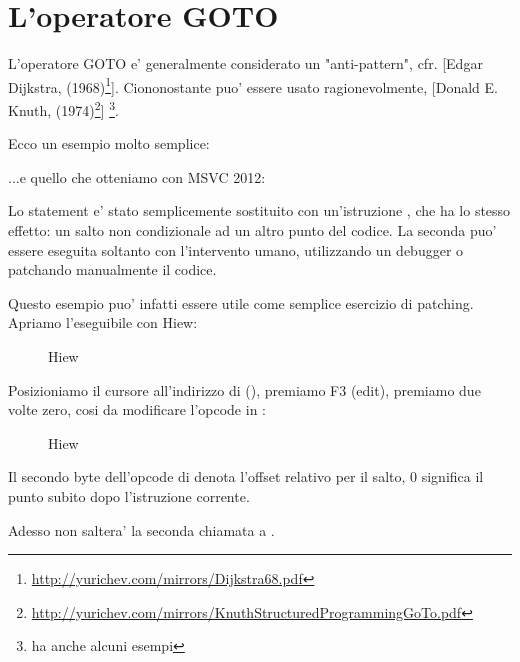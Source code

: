 \section{L'operatore GOTO}

L'operatore GOTO e' generalmente considerato un "anti-pattern", cfr. [Edgar Dijkstra,  (1968)\footnote{\url{http://yurichev.com/mirrors/Dijkstra68.pdf}}].
Ciononostante puo' essere usato ragionevolmente, [Donald E. Knuth,  (1974)\footnote{\url{http://yurichev.com/mirrors/KnuthStructuredProgrammingGoTo.pdf}}]
\footnote{\InSqBrackets{\CNotes} ha anche alcuni esempi}.

Ecco un esempio molto semplice:



...e quello che otteniamo con MSVC 2012:



Lo statement  e' stato semplicemente sostituito con un'istruzione \JMP, che ha lo stesso effetto: un salto non condizionale
ad un altro punto del codice.
La seconda \printf puo' essere eseguita soltanto con l'intervento umano, utilizzando un debugger o patchando manualmente il codice.

\par

\clearpage

Questo esempio puo' infatti essere utile come semplice esercizio di patching. Apriamo l'eseguibile con Hiew:

\begin{figure}[H]
\centering
{}
\caption{Hiew}
\label{fig:goto_hiew1}
\end{figure}

\clearpage
Posizioniamo il cursore all'indirizzo di \JMP (), 
premiamo F3 (edit), premiamo due volte zero, cosi da modificare l'opcode in :

\begin{figure}[H]
\centering
{}
\caption{Hiew}
\label{fig:goto_hiew2}
\end{figure}

Il secondo byte dell'opcode di \JMP denota l'offset relativo per il salto, 0 significa il punto subito dopo l'istruzione corrente.

Adesso \JMP non saltera' la seconda chiamata a \printf.

